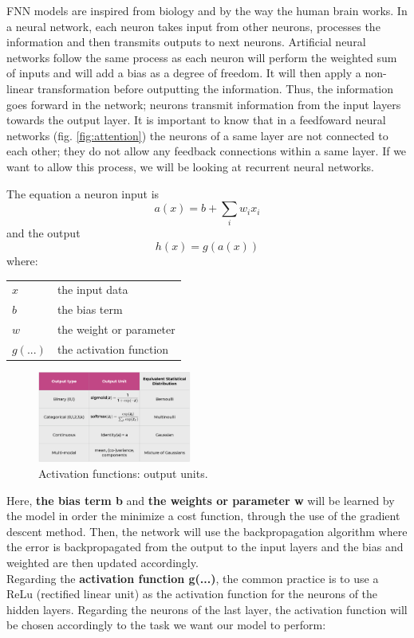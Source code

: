 \documentclass[letter,8pt]{article}\usepackage[]{graphicx}\usepackage[]{color}
\makeatletter
\newenvironment{conditions}
  {\par\vspace{\abovedisplayskip}\noindent\begin{tabular}{>{$}l<{$} @{${}={}$} l}}
  {\end{tabular}\par\vspace{\belowdisplayskip}}
\makeatother
\begin{document}
FNN models are inspired from biology and by the way the human brain works. In a neural network, each neuron takes input from other neurons, processes the information and then transmits outputs to next neurons. Artificial neural networks follow the same process as each neuron will perform the weighted sum of inputs and will add a bias as a degree of freedom. It will then apply a non-linear transformation before outputting the information. Thus, the information goes forward in the network; neurons transmit information from the input layers towards the output layer. It is important to know that in a feedfoward neural networks (fig. \ref{fig:attention}) the neurons of a same layer are not connected to each other; they do not allow any feedback connections within a same layer. If we want to allow this process, we will be looking at recurrent neural networks.

The equation a neuron input is  
\begin{equation}
a(x) = b +\sum_{i}{w_i x_i}
\end{equation}
and the output
\begin{equation}
h(x) = g(a(x))
\end{equation}
where:
\begin{conditions}
 x     &  the input data \\
 b     &  the bias term \\
 w     &  the weight or parameter \\   
 g(...) &  the activation function
\end{conditions}

\begin{figure}
  \begin{center}
    \includegraphics[width=0.45\textwidth]{figure/activation_function_output.png}
      \end{center}
     \caption{Activation functions: output units. \cite[slide 24]{nnheca2019}}
     \label{fig:activation}
\end{figure}
Here, \textbf{the bias term  b} and \textbf{the weights or parameter w} will be learned by the model in order the minimize a cost function, through the use of the gradient descent method. Then, the network will use the backpropagation algorithm where the error is backpropagated from the output to the input layers and the bias and weighted are then updated accordingly.\\
Regarding the \textbf{activation function g(...)}, the common practice is to use a ReLu (rectified linear unit) as the activation function for the neurons of the hidden layers. Regarding the neurons of the last layer, the activation function will be chosen accordingly to the task we want our model to perform:
\end{document}
